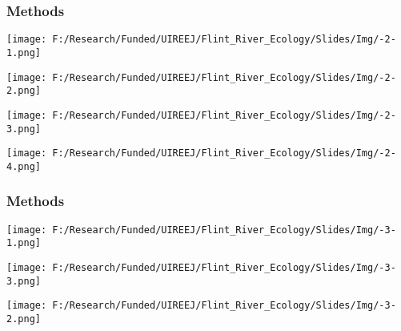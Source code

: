 \documentclass[10pt]{beamer}
\begin{document}
\begin{frame}
    \frametitle{Methods} %
    
    \begin{minipage}{0.49\textwidth}
        \begin{center}
          \texttt{[image: F:/Research/Funded/UIREEJ/Flint\_River\_Ecology/Slides/Img/-2-1.png]}
        \end{center}
    \end{minipage} %
      \begin{minipage}{0.49\textwidth}
        \begin{center}
          \texttt{[image: F:/Research/Funded/UIREEJ/Flint\_River\_Ecology/Slides/Img/-2-2.png]}
        \end{center}
    \end{minipage} %
    \begin{minipage}{0.49\textwidth}
        \begin{center}
          \texttt{[image: F:/Research/Funded/UIREEJ/Flint\_River\_Ecology/Slides/Img/-2-3.png]}
        \end{center}
    \end{minipage} %
      \begin{minipage}{0.49\textwidth}
        \begin{center}
          \texttt{[image: F:/Research/Funded/UIREEJ/Flint\_River\_Ecology/Slides/Img/-2-4.png]}
        \end{center}
    \end{minipage} 
\end{frame}

\begin{frame}
    \frametitle{Methods} %
    
    \begin{minipage}{0.49\textwidth}
        \begin{center}
          \texttt{[image: F:/Research/Funded/UIREEJ/Flint\_River\_Ecology/Slides/Img/-3-1.png]}
        \end{center}
    \end{minipage} %
      \begin{minipage}{0.49\textwidth}
        \begin{center}
          \texttt{[image: F:/Research/Funded/UIREEJ/Flint\_River\_Ecology/Slides/Img/-3-3.png]}
        \end{center}
    \end{minipage} %
    \begin{center}
        \texttt{[image: F:/Research/Funded/UIREEJ/Flint\_River\_Ecology/Slides/Img/-3-2.png]}
    \end{center}
\end{frame}
\end{document}
